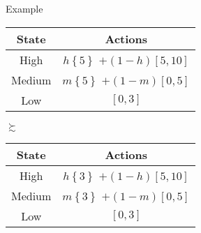 \documentclass[usenames,dvipsnames,aspectratio=169,11pt, envcountsect, handout]{beamer}
\begin{document}
\begin{frame}{Example}
	\begin{table}[H]
		\centering
		\begin{minipage}{0.45\textwidth}
			\centering
			\begin{tabular}{c | c}
				State                          & Actions                                                                                       \\
				\hline
				{\color{bleudefrance} High}    & {\color{bleudefrance}\( h \left\{ 5 \right\} \) } \(+ \left(1-h \right) \left[5,10 \right] \) \\
				{\color{bleudefrance} Medium } & {\color{bleudefrance}\( m \left\{ 5 \right\} \) } \(+ \left(1-m \right) \left[0,5 \right] \)  \\
				Low                            & \( \left[0,3 \right] \)                                                                       \\
			\end{tabular}
			\vspace{0.5cm} %
		\end{minipage}\hspace{0.25cm} \pause %
		\( \succsim \) %
		\hspace{0.25cm}
		\begin{minipage}{0.45\textwidth}
			\centering
			\begin{tabular}{c | c}
				State                          & Actions                                                                                       \\
				\hline
				{\color{bleudefrance} High}    & {\color{bleudefrance}\( h \left\{ 3 \right\} \) } \(+ \left(1-h \right) \left[5,10 \right] \) \\
				{\color{bleudefrance} Medium } & {\color{bleudefrance}\( m \left\{ 3 \right\} \) } \(+ \left(1-m \right) \left[0,5 \right] \)  \\
				Low                            & \( \left[0,3 \right] \)                                                                       \\
			\end{tabular}
			\vspace{0.5cm} %
		\end{minipage}
	\end{table} \pause


\end{frame}
\end{document}
